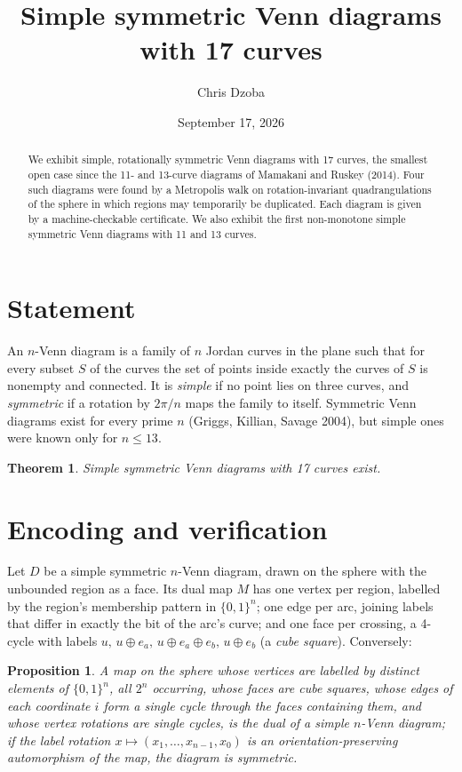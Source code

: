 \documentclass[11pt]{article}
\title{Simple symmetric Venn diagrams with 17 curves}
\author{Chris Dzoba}
\date{September 17, 2026}
\newtheorem{theorem}{Theorem}
\newtheorem{proposition}{Proposition}
\begin{document}
\maketitle

\begin{abstract}
We exhibit simple, rotationally symmetric Venn diagrams with 17 curves, the smallest open case since
the 11- and 13-curve diagrams of Mamakani and Ruskey (2014). Four such diagrams were found by a Metropolis
walk on rotation-invariant quadrangulations of the sphere in which regions may temporarily be
duplicated. Each diagram is given by a machine-checkable certificate. We also exhibit the first
non-monotone simple symmetric Venn diagrams with 11 and 13 curves.
\end{abstract}

\section{Statement}
An $n$-Venn diagram is a family of $n$ Jordan curves in the plane such that for every subset $S$ of the curves
the set of points inside exactly the curves of $S$ is nonempty and connected. It is \emph{simple} if no point lies
on three curves, and \emph{symmetric} if a rotation by $2\pi/n$ maps the family to itself. Symmetric Venn diagrams
exist for every prime $n$ (Griggs, Killian, Savage 2004), but simple ones were known only for $n\le 13$.

\begin{theorem}
Simple symmetric Venn diagrams with 17 curves exist.
\end{theorem}

\section{Encoding and verification}
Let $D$ be a simple symmetric $n$-Venn diagram, drawn on the sphere with the unbounded region as a face.
Its dual map $M$ has one vertex per region, labelled by the region's membership pattern in $\{0,1\}^n$;
one edge per arc, joining labels that differ in exactly the bit of the arc's curve; and one face per crossing,
a 4-cycle with labels $u,\,u{\oplus}e_a,\,u{\oplus}e_a{\oplus}e_b,\,u{\oplus}e_b$ (a \emph{cube square}).
Conversely:

\begin{proposition}
A map on the sphere whose vertices are labelled by distinct elements of $\{0,1\}^n$, all $2^n$ occurring,
whose faces are cube squares, whose edges of each coordinate $i$ form a single cycle through the faces containing
them, and whose vertex rotations are single cycles, is the dual of a simple $n$-Venn diagram; if the label rotation
$x\mapsto(x_1,\dots,x_{n-1},x_0)$ is an orientation-preserving automorphism of the map, the diagram is symmetric.
\end{proposition}
\end{document}
